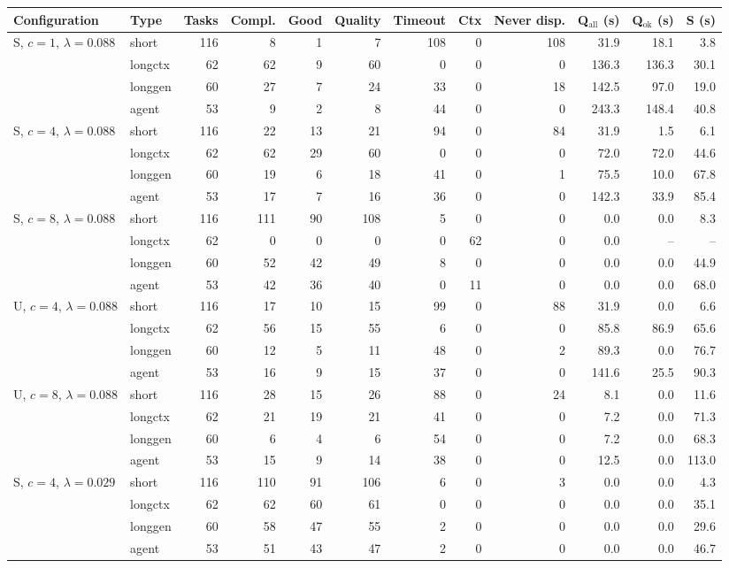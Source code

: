 \begin{tabular}{@{}llrrrrrrrrrr@{}}
\toprule
Configuration & Type & Tasks & Compl. & Good & Quality & Timeout & Ctx & Never disp. & Q$_{\mathrm{all}}$ (s) & Q$_{\mathrm{ok}}$ (s) & S (s) \\
\midrule
S, $c{=}1$, $\lambda{=}0.088$ & short & 116 & 8 & 1 & 7 & 108 & 0 & 108 & 31.9 & 18.1 & 3.8 \\
 & longctx & 62 & 62 & 9 & 60 & 0 & 0 & 0 & 136.3 & 136.3 & 30.1 \\
 & longgen & 60 & 27 & 7 & 24 & 33 & 0 & 18 & 142.5 & 97.0 & 19.0 \\
 & agent & 53 & 9 & 2 & 8 & 44 & 0 & 0 & 243.3 & 148.4 & 40.8 \\
\addlinespace[2pt]
S, $c{=}4$, $\lambda{=}0.088$ & short & 116 & 22 & 13 & 21 & 94 & 0 & 84 & 31.9 & 1.5 & 6.1 \\
 & longctx & 62 & 62 & 29 & 60 & 0 & 0 & 0 & 72.0 & 72.0 & 44.6 \\
 & longgen & 60 & 19 & 6 & 18 & 41 & 0 & 1 & 75.5 & 10.0 & 67.8 \\
 & agent & 53 & 17 & 7 & 16 & 36 & 0 & 0 & 142.3 & 33.9 & 85.4 \\
\addlinespace[2pt]
S, $c{=}8$, $\lambda{=}0.088$ & short & 116 & 111 & 90 & 108 & 5 & 0 & 0 & 0.0 & 0.0 & 8.3 \\
 & longctx & 62 & 0 & 0 & 0 & 0 & 62 & 0 & 0.0 & -- & -- \\
 & longgen & 60 & 52 & 42 & 49 & 8 & 0 & 0 & 0.0 & 0.0 & 44.9 \\
 & agent & 53 & 42 & 36 & 40 & 0 & 11 & 0 & 0.0 & 0.0 & 68.0 \\
\addlinespace[2pt]
U, $c{=}4$, $\lambda{=}0.088$ & short & 116 & 17 & 10 & 15 & 99 & 0 & 88 & 31.9 & 0.0 & 6.6 \\
 & longctx & 62 & 56 & 15 & 55 & 6 & 0 & 0 & 85.8 & 86.9 & 65.6 \\
 & longgen & 60 & 12 & 5 & 11 & 48 & 0 & 2 & 89.3 & 0.0 & 76.7 \\
 & agent & 53 & 16 & 9 & 15 & 37 & 0 & 0 & 141.6 & 25.5 & 90.3 \\
\addlinespace[2pt]
U, $c{=}8$, $\lambda{=}0.088$ & short & 116 & 28 & 15 & 26 & 88 & 0 & 24 & 8.1 & 0.0 & 11.6 \\
 & longctx & 62 & 21 & 19 & 21 & 41 & 0 & 0 & 7.2 & 0.0 & 71.3 \\
 & longgen & 60 & 6 & 4 & 6 & 54 & 0 & 0 & 7.2 & 0.0 & 68.3 \\
 & agent & 53 & 15 & 9 & 14 & 38 & 0 & 0 & 12.5 & 0.0 & 113.0 \\
\addlinespace[2pt]
S, $c{=}4$, $\lambda{=}0.029$ & short & 116 & 110 & 91 & 106 & 6 & 0 & 3 & 0.0 & 0.0 & 4.3 \\
 & longctx & 62 & 62 & 60 & 61 & 0 & 0 & 0 & 0.0 & 0.0 & 35.1 \\
 & longgen & 60 & 58 & 47 & 55 & 2 & 0 & 0 & 0.0 & 0.0 & 29.6 \\
 & agent & 53 & 51 & 43 & 47 & 2 & 0 & 0 & 0.0 & 0.0 & 46.7 \\
\bottomrule
\end{tabular}
